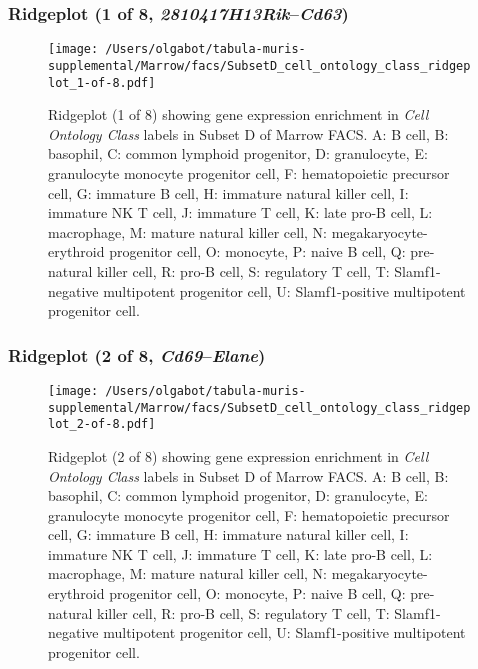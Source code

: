 \subsubsection{Ridgeplot (1 of 8, \emph{2810417H13Rik}--\emph{Cd63})}
\begin{figure}[h]
\centering
\texttt{[image: /Users/olgabot/tabula-muris-supplemental/Marrow/facs/SubsetD\_cell\_ontology\_class\_ridgeplot\_1-of-8.pdf]}

\caption{ Ridgeplot (1 of 8)  showing gene expression enrichment in \emph{Cell Ontology Class} labels in Subset D of Marrow FACS. A: B cell, B: basophil, C: common lymphoid progenitor, D: granulocyte, E: granulocyte monocyte progenitor cell, F: hematopoietic precursor cell, G: immature B cell, H: immature natural killer cell, I: immature NK T cell, J: immature T cell, K: late pro-B cell, L: macrophage, M: mature natural killer cell, N: megakaryocyte-erythroid progenitor cell, O: monocyte, P: naive B cell, Q: pre-natural killer cell, R: pro-B cell, S: regulatory T cell, T: Slamf1-negative multipotent progenitor cell, U: Slamf1-positive multipotent progenitor cell.}
\end{figure}


\clearpage

\subsubsection{Ridgeplot (2 of 8, \emph{Cd69}--\emph{Elane})}
\begin{figure}[h]
\centering
\texttt{[image: /Users/olgabot/tabula-muris-supplemental/Marrow/facs/SubsetD\_cell\_ontology\_class\_ridgeplot\_2-of-8.pdf]}

\caption{ Ridgeplot (2 of 8)  showing gene expression enrichment in \emph{Cell Ontology Class} labels in Subset D of Marrow FACS. A: B cell, B: basophil, C: common lymphoid progenitor, D: granulocyte, E: granulocyte monocyte progenitor cell, F: hematopoietic precursor cell, G: immature B cell, H: immature natural killer cell, I: immature NK T cell, J: immature T cell, K: late pro-B cell, L: macrophage, M: mature natural killer cell, N: megakaryocyte-erythroid progenitor cell, O: monocyte, P: naive B cell, Q: pre-natural killer cell, R: pro-B cell, S: regulatory T cell, T: Slamf1-negative multipotent progenitor cell, U: Slamf1-positive multipotent progenitor cell.}
\end{figure}


\clearpage

